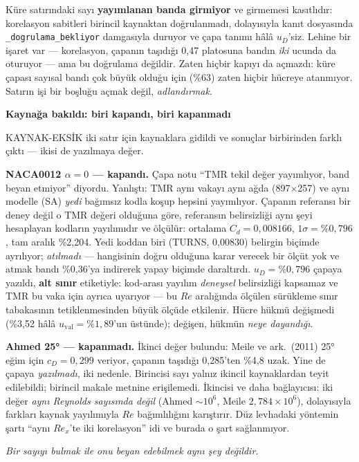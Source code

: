 \documentclass[11pt,a4paper]{article}
\newcommand{\kkkenar}{lacivert}
\newcommand{\kkzemin}{kod}
\newenvironment{renkkutu}[3]{%
  \renewcommand{\kkkenar}{#1}\renewcommand{\kkzemin}{#2}%
  \par\medskip\noindent
  \begin{lrbox}{\kutugovde}%
  \begin{minipage}{\dimexpr\linewidth-2\fboxsep-2\fboxrule\relax}\footnotesize
  \textcolor{#1}{\textbf{#3}}\par\vspace{3pt}%
}{%
  \end{minipage}%
  \end{lrbox}%
  \noindent\fcolorbox{\kkkenar}{\kkzemin}{\usebox{\kutugovde}}%
  \par\medskip
}
\newenvironment{olculdu}[1]{\begin{renkkutu}{iyi}{iyibg}{#1}}{\end{renkkutu}}
\begin{document}
\noindent Küre satırındaki sayı \textbf{yayımlanan banda girmiyor} ve girmemesi
kasıtlıdır: korelasyon sabitleri birincil kaynaktan doğrulanmadı, dolayısıyla
kanıt dosyasında \texttt{\_dogrulama\_bekliyor} damgasıyla duruyor ve çapa
tanımı hâlâ $u_D$'siz. Lehine bir işaret var --- korelasyon, çapanın taşıdığı
0{,}47 platosuna bandın \emph{iki} ucunda da oturuyor --- ama bu doğrulama
değildir. Zaten hiçbir kapıyı da açmazdı: küre çapası sayısal bandı çok büyük
olduğu için (\%63) zaten hiçbir hücreye atanmıyor. Satırın işi bir boşluğu
açmak değil, \emph{adlandırmak}.

\begin{olculdu}{Kaynağa bakıldı: biri kapandı, biri kapanmadı}
KAYNAK-EKSİK iki satır için kaynaklara gidildi ve sonuçlar birbirinden farklı
çıktı --- ikisi de yazılmaya değer.

\textbf{NACA0012 $\alpha{=}0$ --- kapandı.} Çapa notu ``TMR tekil değer
yayımlıyor, band beyan etmiyor'' diyordu. Yanlıştı: TMR aynı vakayı aynı ağda
(897$\times$257) ve aynı modelle (SA) \emph{yedi} bağımsız kodla koşup hepsini
yayımlıyor. Çapanın referansı bir deney değil o TMR değeri olduğuna göre,
referansın belirsizliği aynı şeyi hesaplayan kodların yayılımıdır ve ölçülür:
ortalama $C_d = 0{,}008166$, $1\sigma = \%0{,}796$, tam aralık \%2{,}204. Yedi
koddan biri (TURNS, 0{,}00830) belirgin biçimde ayrılıyor; \emph{atılmadı} ---
hangisinin doğru olduğuna karar verecek bir ölçüt yok ve atmak bandı \%0{,}36'ya
indirerek yapay biçimde daraltırdı. $u_D = \%0{,}796$ çapaya yazıldı,
\textbf{alt sınır} etiketiyle: kod-arası yayılım \emph{deneysel} belirsizliği
kapsamaz ve TMR bu vaka için ayrıca uyarıyor --- bu $Re$ aralığında ölçülen
sürükleme sınır tabakasının tetiklenmesinden büyük ölçüde etkilenir. Hücre
hükmü değişmedi (\%3{,}52 hâlâ $u_{\mathrm{val}}{=}\%1{,}89$'un üstünde);
değişen, hükmün \emph{neye dayandığı}.

\textbf{Ahmed 25° --- kapanmadı.} İkinci değer bulundu: Meile ve ark.\ (2011)
25° eğim için $c_D = 0{,}299$ veriyor, çapanın taşıdığı 0{,}285'ten \%4{,}8
uzak. Yine de çapaya \emph{yazılmadı}, iki nedenle. Birincisi sayı yalnız
ikincil kaynaklardan teyit edilebildi; birincil makale metnine erişilemedi.
İkincisi ve daha bağlayıcısı: iki değer \emph{aynı Reynolds sayısında değil}
(Ahmed $\sim$$10^6$, Meile $2{,}784{\times}10^6$), dolayısıyla farkları kaynak
yayılımıyla $Re$ bağımlılığını karıştırır. Düz levhadaki yöntemin şartı ``aynı
$Re_x$'te iki korelasyon'' idi ve burada o şart sağlanmıyor.

\begin{center}\itshape
Bir sayıyı bulmak ile onu beyan edebilmek aynı şey değildir.
\end{center}
\end{olculdu}
\end{document}
